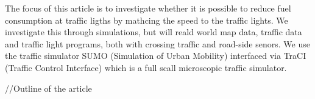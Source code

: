 The focus of this article is to investigate whether it is possible to reduce fuel consumption at traffic ligths by mathcing the speed to the traffic lights. We investigate this through simulations, but will reald world map data, traffic data and traffic light programs, %
both with crossing traffic and road-side senors.
We use the traffic simulator SUMO (Simulation of Urban Mobility)\cite{sumo} interfaced via TraCI (Traffic Control Interface)\cite{traci} which is a full scall microscopic traffic simulator.

//Outline of the article





